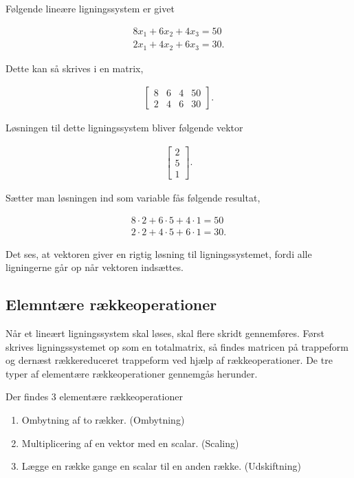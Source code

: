 \begin{eks}
Følgende lineære ligningssystem er givet

\begin{align*}
8x_1+6x_2+4x_3 = 50 \\
2x_1+4x_2+6x_3 = 30.
\end{align*}

Dette kan så skrives i en matrix,

\begin{align*}
\begin{bmatrix}
8 & 6 & 4 & 50 \\
2 & 4 & 6 & 30
\end{bmatrix}.
\end{align*}

Løsningen til dette ligningssystem bliver følgende vektor

\begin{align*}
\begin{bmatrix}
2 \\
5 \\
1
\end{bmatrix}.
\end{align*}

Sætter man løsningen ind som variable fås følgende resultat,

\begin{align*}
8 \cdot 2 + 6 \cdot 5 + 4 \cdot 1 = 50 \\
2 \cdot 2 + 4 \cdot 5 + 6 \cdot 1 = 30.
\end{align*}

Det ses, at vektoren giver en rigtig løsning til ligningssystemet, fordi alle ligningerne går op når vektoren indsættes. 

\end{eks}

\subsection{Elemntære rækkeoperationer}
Når et lineært ligningssystem skal løses, skal flere skridt gennemføres. Først skrives ligningssystemet op som en totalmatrix, så findes matricen på trappeform og dernæst rækkereduceret trappeform ved hjælp af rækkeoperationer. De tre typer af elementære rækkeoperationer gennemgås herunder. \\

\begin{defn}
Der findes 3 elementære rækkeoperationer
\begin{enumerate}
\item Ombytning af to rækker. (Ombytning)
\item Multiplicering af en vektor med en scalar. (Scaling)
\item Lægge en række gange en scalar til en anden række. (Udskiftning)
\end{enumerate}
\label{defn_elemen_operation}
\end{defn}

